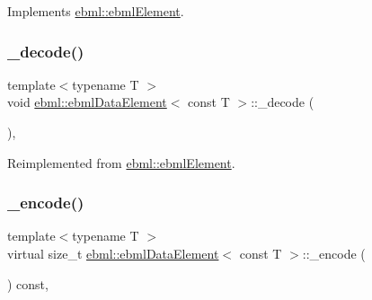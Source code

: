 Implements \mbox{\hyperlink{classebml_1_1ebmlElement_af7852c01970bf937f6787eac4843bdbd}{ebml\+::ebml\+Element}}.

\mbox{\label{classebml_1_1ebmlDataElement_3_01const_01T_01_4_ad5bc71b4d9aa91a02cf888a06e116482}} 
\subsubsection{\texorpdfstring{\+\_\+decode()}{\_decode()}\hspace{0.1cm}{\footnotesize\ttfamily [2/2]}}
{\footnotesize\ttfamily template$<$typename T $>$ \\
void \mbox{\hyperlink{classebml_1_1ebmlDataElement}{ebml\+::ebml\+Data\+Element}}$<$ const T $>$\+::\+\_\+decode (\begin{DoxyParamCaption}\item[{const \mbox{\hyperlink{classebml_1_1parseFile}{parse\+File}} \&}]{ }\end{DoxyParamCaption})\hspace{0.3cm}{\ttfamily [protected]}, {\ttfamily [virtual]}}



Reimplemented from \mbox{\hyperlink{classebml_1_1ebmlElement_adf579591cece6b61d85cdb48861c3620}{ebml\+::ebml\+Element}}.

\mbox{\label{classebml_1_1ebmlDataElement_3_01const_01T_01_4_aac802a573eaeaa5b856d5e74deb9dd3a}} 
\subsubsection{\texorpdfstring{\+\_\+encode()}{\_encode()}}
{\footnotesize\ttfamily template$<$typename T $>$ \\
virtual size\+\_\+t \mbox{\hyperlink{classebml_1_1ebmlDataElement}{ebml\+::ebml\+Data\+Element}}$<$ const T $>$\+::\+\_\+encode (\begin{DoxyParamCaption}\item[{char $\ast$}]{ }\end{DoxyParamCaption}) const\hspace{0.3cm}{\ttfamily [protected]}, {\ttfamily [virtual]}}



